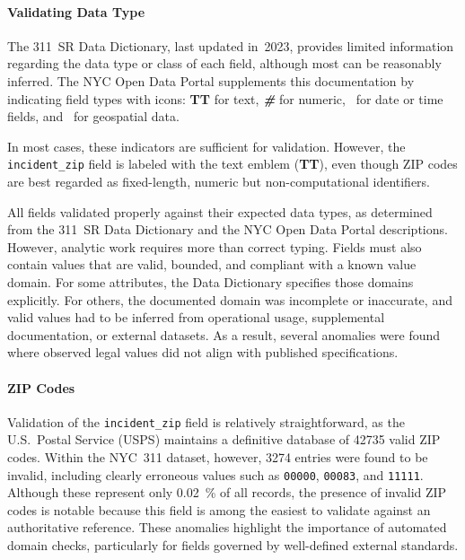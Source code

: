 \documentclass[linenumber]{jdsart}
\newcommand{\numint}[1]{\num[round-mode=none]{#1}}
\begin{document}
\paragraph{Validating Data Type}
\label{par:validatingdatatype}
The 311~SR Data Dictionary, last updated in~2023, provides limited information
regarding the data type or class of each field, although most can be
reasonably inferred. The NYC Open Data Portal supplements this documentation
by indicating field types with icons:
\textbf{T}{\scriptsize\textbf{T}} for text, \emph{\textbf{\#}} for numeric,
\faCalendar\ for date or time fields, and \faMapMarker\ for geospatial data.

In most cases, these indicators are sufficient for validation. However, the
\texttt{incident\_zip} field is labeled with the text emblem
(\textbf{T}{\scriptsize\textbf{T}}), even though ZIP codes are best regarded as
fixed-length, numeric but non-computational identifiers.

All fields validated properly against their expected data types, as determined
from the 311~SR Data Dictionary and the NYC Open Data Portal descriptions.
However, analytic work requires more than correct typing. Fields must also
contain values that are valid, bounded, and compliant with a known value
domain. For some attributes, the Data Dictionary specifies those domains
explicitly. For others, the documented domain was incomplete or inaccurate,
and valid values had to be inferred from operational usage, supplemental
documentation, or external datasets. As a result, several anomalies were found
where observed legal values did not align with published specifications.

\paragraph{ZIP Codes}
\label{par:zipcodesissues}
Validation of the \texttt{incident\_zip} field is relatively straightforward,
as the U.S.\ Postal Service (\textsc{USPS}) maintains a definitive database of
\numint{42735} valid ZIP codes. Within the NYC~311 dataset, however,
\numint{3274} entries were found to be invalid, including clearly erroneous values
such as \texttt{00000}, \texttt{00083}, and \texttt{11111}.
Although these represent only \SI[round-precision = 2]{0.02}{\percent} of all
records, the presence of invalid ZIP codes is notable because this field is
among the easiest to validate against an authoritative reference. These
anomalies highlight the importance of automated domain checks, particularly
for fields governed by well-defined external standards.
\end{document}
